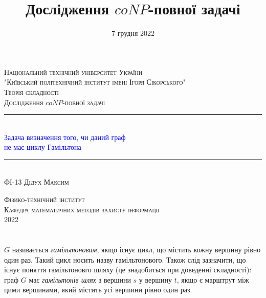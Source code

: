 \documentclass[14pt]{article}
\begin{document}
\begin{spacing}{1.175}	
	\begin{titlepage} 
		\newcommand{\HRule}{\rule{\linewidth}{0.3mm}}
		\center 
		
		\textsc{\large Національний технічний університет України
			\\"Київський політехнічний інститут імені Ігоря Сікорського"}\\[1.5cm]
		
		\vspace{5cm}
		\textsc{\large Теорія складності}\\[0.5cm]
		
		\textsc{\large Дослідження \(coNP\)-повної задачі}\\[0.5cm] 
		
		\HRule\\[0.4cm]
		
		{\huge \textcolor{blue}{Задача визначення того, чи даний граф\\
            не має циклу Гамільтона}}\\[0.4cm]
		
		\HRule\\[1.5cm]
		\textsc{\large ФІ-13 Дідух Максим}\\[0.5cm]
		
		\vspace{7.5cm}
		
		\textsc{\large Фізико-технічний інститут}\\[0.5cm]
		\textsc{\large Кафедра математичних методів захисту інформації}\\[0.5cm]
		{\large {2022}} 
	\end{titlepage}
    
    \newpage
    \title{\Large Дослідження \(coNP\)-повної задачі}
    \date{\large 7 грудня 2022}
    \maketitle
    \tableofcontents                                                                            %
    \newpage
    \section{}
         \(G\) називається \textit{гамільтоновим}, якщо існує цикл, що містить кожну вершину рівно один раз. Такий цикл носить назву гамільтонового. Також слід зазначити, що існує поняття гамільтоновго шляху (це знадобиться при доведенні складності): граф \(G\) має \textit{гамільтонів шлях} з вершини \(s\) у вершину \(t\), якщо є марштрут між цими вершинами, який містить усі вершини рівно один раз.
        

\end{spacing}
\end{document}
